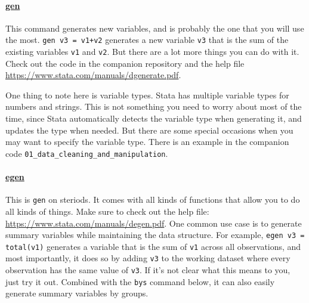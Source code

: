 \paragraph{\underline{gen}} This command generates new variables, and is probably the one that you will use the most. \verb|gen v3 = v1+v2| generates a new variable \verb|v3| that is the sum of the existing variables \verb|v1| and \verb|v2|. But there are a lot more things you can do with it. Check out the code in the companion repository and the help file \url{https://www.stata.com/manuals/dgenerate.pdf}. 

One thing to note here is variable types. Stata has multiple variable types for numbers and strings. This is not something you need to worry about most of the time, since Stata automatically detects the variable type when generating it, and updates the type when needed. But there are some special occasions when you may want to specify the variable type. There is an example in the companion code \verb|01_data_cleaning_and_manipulation|.

\paragraph{\underline{egen}} This is \verb|gen| on steriods. It comes with all kinds of functions that allow you to do all kinds of things. Make sure to check out the help file: \url{https://www.stata.com/manuals/degen.pdf}. One common use case is to generate summary variables while maintaining the data structure. For example, \verb|egen v3 = total(v1)| generates a variable that is the sum of \verb|v1| across all observations, and most importantly, it does so by adding \verb|v3| to the working dataset where every observation has the same value of \verb|v3|. If it's not clear what this means to you, just try it out. Combined with the \verb|bys| command below, it can also easily generate summary variables by groups. 

